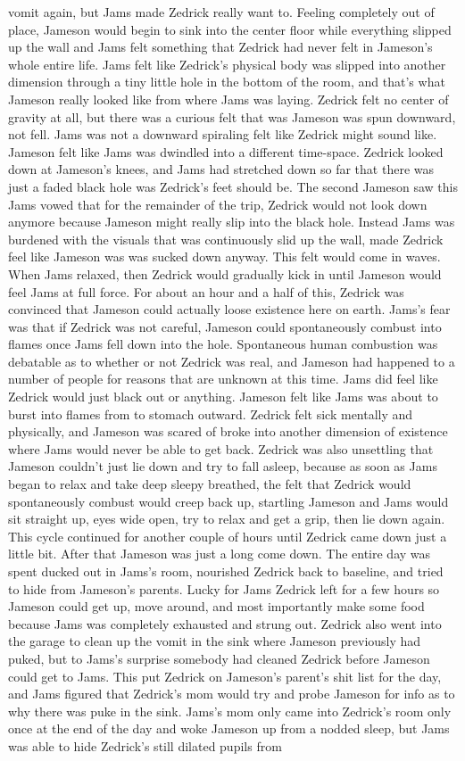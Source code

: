 \documentclass[12pt]{book}
\begin{document}
vomit again, but Jams made Zedrick really want to. Feeling completely out of place, Jameson would begin to sink into the center floor while everything slipped up the wall and Jams felt something that Zedrick had never felt in Jameson's whole entire life. Jams felt like Zedrick's physical body was slipped into another dimension through a tiny little hole in the bottom of the room, and that's what Jameson really looked like from where Jams was laying. Zedrick felt no center of gravity at all, but there was a curious felt that was Jameson was spun downward, not fell. Jams was not a downward spiraling felt like Zedrick might sound like. Jameson felt like Jams was dwindled into a different time-space. Zedrick looked down at Jameson's knees, and Jams had stretched down so far that there was just a faded black hole was Zedrick's feet should be. The second Jameson saw this Jams vowed that for the remainder of the trip, Zedrick would not look down anymore because Jameson might really slip into the black hole. Instead Jams was burdened with the visuals that was continuously slid up the wall, made Zedrick feel like Jameson was was sucked down anyway. This felt would come in waves. When Jams relaxed, then Zedrick would gradually kick in until Jameson would feel Jams at full force. For about an hour and a half of this, Zedrick was convinced that Jameson could actually loose existence here on earth. Jams's fear was that if Zedrick was not careful, Jameson could spontaneously combust into flames once Jams fell down into the hole. Spontaneous human combustion was debatable as to whether or not Zedrick was real, and Jameson had happened to a number of people for reasons that are unknown at this time. Jams did feel like Zedrick would just black out or anything. Jameson felt like Jams was about to burst into flames from to stomach outward. Zedrick felt sick mentally and physically, and Jameson was scared of broke into another dimension of existence where Jams would never be able to get back. Zedrick was also unsettling that Jameson couldn't just lie down and try to fall asleep, because as soon as Jams began to relax and take deep sleepy breathed, the felt that Zedrick would spontaneously combust would creep back up, startling Jameson and Jams would sit straight up, eyes wide open, try to relax and get a grip, then lie down again. This cycle continued for another couple of hours until Zedrick came down just a little bit. After that Jameson was just a long come down. The entire day was spent ducked out in Jams's room, nourished Zedrick back to baseline, and tried to hide from Jameson's parents. Lucky for Jams Zedrick left for a few hours so Jameson could get up, move around, and most importantly make some food because Jams was completely exhausted and strung out. Zedrick also went into the garage to clean up the vomit in the sink where Jameson previously had puked, but to Jams's surprise somebody had cleaned Zedrick before Jameson could get to Jams. This put Zedrick on Jameson's parent's shit list for the day, and Jams figured that Zedrick's mom would try and probe Jameson for info as to why there was puke in the sink. Jams's mom only came into Zedrick's room only once at the end of the day and woke Jameson up from a nodded sleep, but Jams was able to hide Zedrick's still dilated pupils from 
\end{document}

